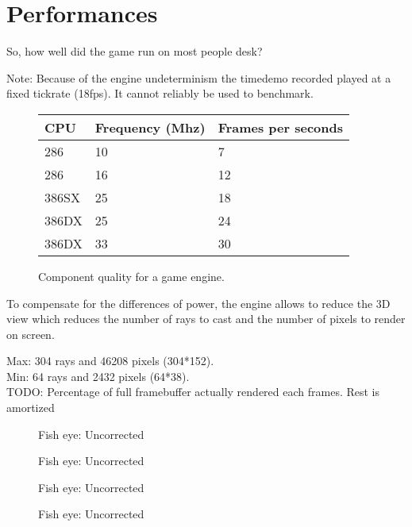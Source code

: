 \section{Performances}
So, how well did the game run on most people desk?

Note: Because of the engine undeterminism the timedemo recorded played at a fixed tickrate (18fps). It cannot reliably be used to benchmark.

\begin{figure}[H]
\centering
\begin{tabularx}{\textwidth}{ X X X }
  \toprule
  \textbf{CPU} & \textbf{Frequency (Mhz)} & \textbf{Frames per seconds} \\ \bottomrule
  286 & 10 & 7 \\
286 & 16 & 12 \\
386SX & 25 &  18 \\
386DX & 25 & 24 \\
386DX & 33 & 30 \\ \bottomrule
\end{tabularx}
\caption{Component quality for a game engine.}
\end{figure}

To compensate for the differences of power, the engine allows to reduce the 3D view which reduces the number of rays to cast and the number of pixels to render on screen.

Max: 304 rays and 46208 pixels (304*152).\\
Min:  64 rays and  2432 pixels (64*38).\\
TODO: Percentage of full framebuffer actually rendered each frames. Rest is amortized




  \begin{figure}[H]
\centering
  \caption{Fish eye: Uncorrected} 
 \end{figure}
 \par

   \begin{figure}[H]
\centering
  \caption{Fish eye: Uncorrected} 
 \end{figure}
 \par

   \begin{figure}[H]
\centering
  \caption{Fish eye: Uncorrected} 
 \end{figure}
 \par


    \begin{figure}[H]
\centering
  \caption{Fish eye: Uncorrected} 
 \end{figure}
 \par